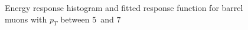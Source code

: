 \documentclass{cmspaper}
\begin{document}
\begin{figure}[htb!]
\begin{center}
    \caption{ Energy response histogram and fitted response function for barrel muons with $p_{T}$ between 
      $5$~\GeV and $7$~\GeV 
    }
    \label{fig:MuonResponse_PtBin1_Barrel}
  \end{center}
\end{figure}
\end{document}
